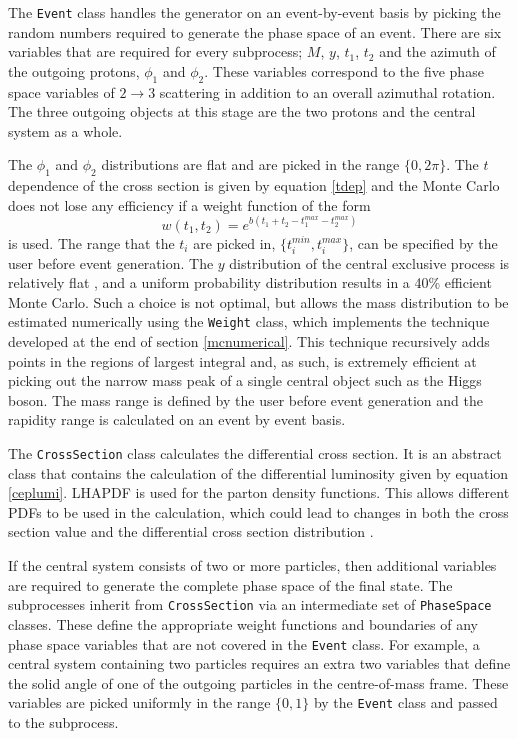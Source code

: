 The \texttt{Event} class handles the generator on an event-by-event basis by picking the random numbers required to generate the phase space of an event. There are six variables that are required for every subprocess; $M$, $y$, $t_1$, $t_2$ and the azimuth of the outgoing protons, $\phi_1$ and $\phi_2$. These variables correspond to the five phase space variables of $2\rightarrow3$ scattering in addition to an overall azimuthal rotation. The three outgoing objects at this stage are the two protons and the central system as a whole.

The $\phi_1$ and $\phi_2$ distributions are flat and are picked in the range $\{0, 2\pi\}$. The $t$ dependence of the cross section is given by equation \ref{tdep} and the Monte Carlo does not lose any efficiency if a weight function of the form 
\begin{equation}
w(t_1,t_2) = e^{b(t_1 + t_2 - t_{1}^{max} - t_{2}^{max})}
\end{equation}
is used. The range that the $t_i$ are picked in, $\{t_i^{min},t_i^{max}\}$, can be specified by the user before event generation. The $y$ distribution of the central exclusive process is relatively flat \cite{Khoze:2001xm}, and a uniform probability distribution results in a 40\% efficient Monte Carlo. Such a choice is not optimal, but allows the mass distribution to be estimated numerically using the  \texttt{Weight} class, which implements the technique developed at the end of section \ref{mcnumerical}. This technique recursively adds points in the regions of largest integral and, as such, is extremely efficient at picking out the narrow mass peak of a single central object such as the Higgs boson. The mass range is defined by the user before event generation and the rapidity range is calculated on an event by event basis. 

The \texttt{CrossSection} class calculates the differential cross section. It is an abstract class that contains the calculation of the differential luminosity given by equation \ref{ceplumi}. 
LHAPDF \cite{Whalley:2005nh} is used for the parton density functions. This allows different PDFs to be used in the calculation, which could lead to changes in both the cross section value and the differential cross section distribution \cite{Forshaw:2005qp}. 

If the central system consists of two or more particles, then additional variables are required
to generate the complete phase space of the final state. The subprocesses inherit from \texttt{CrossSection} via an intermediate set of \texttt{PhaseSpace} classes. These define the appropriate weight functions and boundaries of any phase space variables that are not covered in the \texttt{Event} class. For example, a central system containing two particles  requires an extra two variables 
that define the solid angle of one of the outgoing particles in the centre-of-mass frame.  
These variables are picked uniformly in the range $\{0, 1\}$ by the \texttt{Event} class and passed to the subprocess. 

